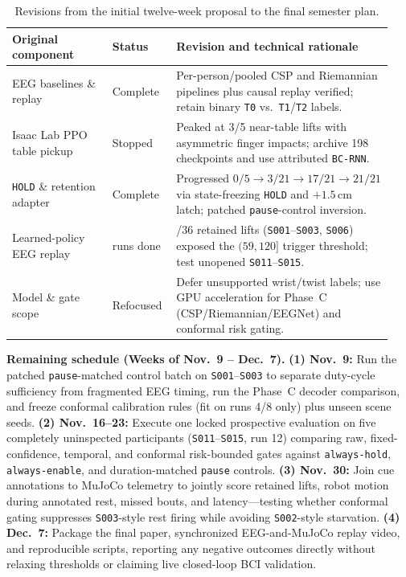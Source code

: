 \documentclass{article}
\begin{document}
\begin{table}[h]
\centering
\caption{Revisions from the initial twelve-week proposal to the final semester plan.}
\label{tab:plan}
\footnotesize
\begin{tabular}{@{}>{\raggedright\arraybackslash}p{0.25\linewidth}>{\raggedright\arraybackslash}p{0.15\linewidth}>{\raggedright\arraybackslash}p{0.54\linewidth}@{}}
\toprule
\textbf{Original component} & \textbf{Status} & \textbf{Revision and technical rationale} \\
\midrule
EEG baselines \& replay & Complete & Per-person/pooled CSP and Riemannian pipelines plus causal replay verified; retain binary \texttt{T0} vs.\ \texttt{T1}/\texttt{T2} labels. \\
Isaac Lab PPO table pickup & Stopped & Peaked at 3/5 near-table lifts with asymmetric finger impacts; archive 198 checkpoints and use attributed \texttt{BC-RNN}. \\
\texttt{HOLD} \& retention adapter & Complete & Progressed $0/5 \!\to\! 3/21 \!\to\! 17/21 \!\to\! 21/21$ via state-freezing \texttt{HOLD} and $+1.5$\,cm latch; patched \texttt{pause}-control inversion. \\
Learned-policy EEG replay & 36 runs done & 24/36 retained lifts (\texttt{S001}--\texttt{S003}, \texttt{S006}) exposed the $(59,120]$ trigger threshold; test unopened \texttt{S011}--\texttt{S015}. \\
Model \& gate scope & Refocused & Defer unsupported wrist/twist labels; use GPU acceleration for Phase~C (CSP/Riemannian/EEGNet) and conformal risk gating. \\
\bottomrule
\end{tabular}
\end{table}

\textbf{Remaining schedule (Weeks of Nov.\ 9 -- Dec.\ 7).}
\textbf{(1) Nov.\ 9:} Run the patched \texttt{pause}-matched control batch on \texttt{S001}--\texttt{S003} to separate duty-cycle sufficiency from fragmented EEG timing, run the Phase~C decoder comparison, and freeze conformal calibration rules (fit on runs 4/8 only) plus unseen scene seeds.
\textbf{(2) Nov.\ 16--23:} Execute one locked prospective evaluation on five completely uninspected participants (\texttt{S011}--\texttt{S015}, run 12) comparing raw, fixed-confidence, temporal, and conformal risk-bounded gates against \texttt{always-hold}, \texttt{always-enable}, and duration-matched \texttt{pause} controls.
\textbf{(3) Nov.\ 30:} Join cue annotations to MuJoCo telemetry to jointly score retained lifts, robot motion during annotated rest, missed bouts, and latency---testing whether conformal gating suppresses \texttt{S003}-style rest firing while avoiding \texttt{S002}-style starvation.
\textbf{(4) Dec.\ 7:} Package the final paper, synchronized EEG-and-MuJoCo replay video, and reproducible scripts, reporting any negative outcomes directly without relaxing thresholds or claiming live closed-loop BCI validation.
\end{document}
